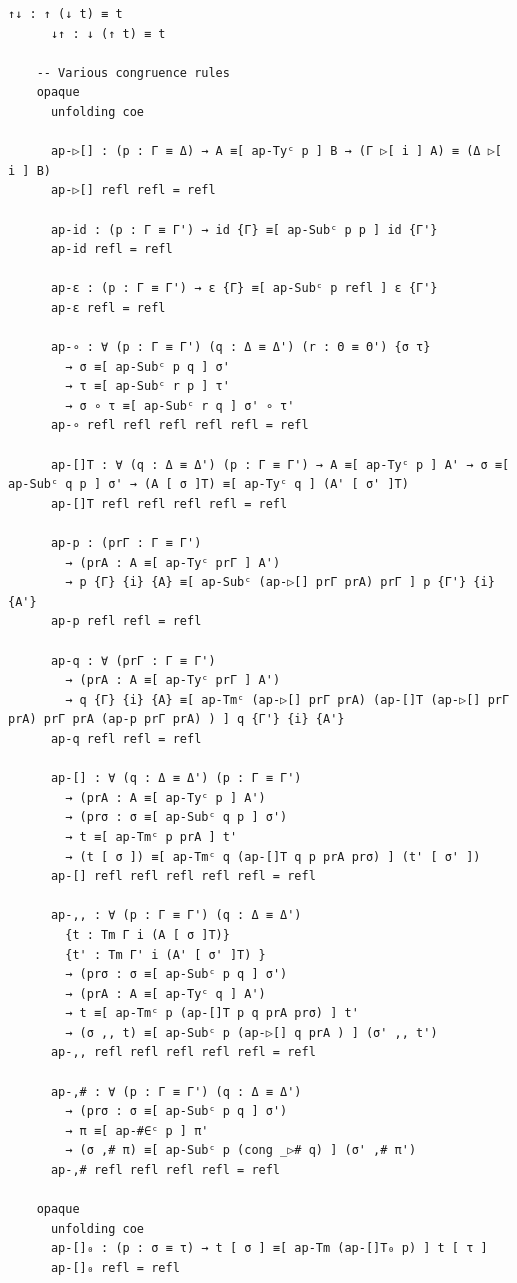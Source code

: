 {\begin{Verbatim}[breaklines=true,breakanywhere=true,fontsize=\scriptsize]
      ↑↓ : ↑ (↓ t) ≡ t
      ↓↑ : ↓ (↑ t) ≡ t

    -- Various congruence rules
    opaque
      unfolding coe

      ap-▷[] : (p : Γ ≡ Δ) → A ≡[ ap-Tyᶜ p ] B → (Γ ▷[ i ] A) ≡ (Δ ▷[ i ] B)
      ap-▷[] refl refl = refl

      ap-id : (p : Γ ≡ Γ') → id {Γ} ≡[ ap-Subᶜ p p ] id {Γ'}
      ap-id refl = refl

      ap-ε : (p : Γ ≡ Γ') → ε {Γ} ≡[ ap-Subᶜ p refl ] ε {Γ'}
      ap-ε refl = refl

      ap-∘ : ∀ (p : Γ ≡ Γ') (q : Δ ≡ Δ') (r : Θ ≡ Θ') {σ τ}
        → σ ≡[ ap-Subᶜ p q ] σ'
        → τ ≡[ ap-Subᶜ r p ] τ'
        → σ ∘ τ ≡[ ap-Subᶜ r q ] σ' ∘ τ'
      ap-∘ refl refl refl refl refl = refl

      ap-[]T : ∀ (q : Δ ≡ Δ') (p : Γ ≡ Γ') → A ≡[ ap-Tyᶜ p ] A' → σ ≡[ ap-Subᶜ q p ] σ' → (A [ σ ]T) ≡[ ap-Tyᶜ q ] (A' [ σ' ]T)
      ap-[]T refl refl refl refl = refl

      ap-p : (prΓ : Γ ≡ Γ')
        → (prA : A ≡[ ap-Tyᶜ prΓ ] A')
        → p {Γ} {i} {A} ≡[ ap-Subᶜ (ap-▷[] prΓ prA) prΓ ] p {Γ'} {i} {A'}
      ap-p refl refl = refl

      ap-q : ∀ (prΓ : Γ ≡ Γ')
        → (prA : A ≡[ ap-Tyᶜ prΓ ] A')
        → q {Γ} {i} {A} ≡[ ap-Tmᶜ (ap-▷[] prΓ prA) (ap-[]T (ap-▷[] prΓ prA) prΓ prA (ap-p prΓ prA) ) ] q {Γ'} {i} {A'}
      ap-q refl refl = refl

      ap-[] : ∀ (q : Δ ≡ Δ') (p : Γ ≡ Γ')
        → (prA : A ≡[ ap-Tyᶜ p ] A')
        → (prσ : σ ≡[ ap-Subᶜ q p ] σ')
        → t ≡[ ap-Tmᶜ p prA ] t'
        → (t [ σ ]) ≡[ ap-Tmᶜ q (ap-[]T q p prA prσ) ] (t' [ σ' ])
      ap-[] refl refl refl refl refl = refl

      ap-,, : ∀ (p : Γ ≡ Γ') (q : Δ ≡ Δ')
        {t : Tm Γ i (A [ σ ]T)}
        {t' : Tm Γ' i (A' [ σ' ]T) }
        → (prσ : σ ≡[ ap-Subᶜ p q ] σ')
        → (prA : A ≡[ ap-Tyᶜ q ] A')
        → t ≡[ ap-Tmᶜ p (ap-[]T p q prA prσ) ] t'
        → (σ ,, t) ≡[ ap-Subᶜ p (ap-▷[] q prA ) ] (σ' ,, t')
      ap-,, refl refl refl refl refl = refl

      ap-,# : ∀ (p : Γ ≡ Γ') (q : Δ ≡ Δ')
        → (prσ : σ ≡[ ap-Subᶜ p q ] σ')
        → π ≡[ ap-#∈ᶜ p ] π'
        → (σ ,# π) ≡[ ap-Subᶜ p (cong _▷# q) ] (σ' ,# π')
      ap-,# refl refl refl refl = refl

    opaque
      unfolding coe
      ap-[]₀ : (p : σ ≡ τ) → t [ σ ] ≡[ ap-Tm (ap-[]T₀ p) ] t [ τ ]
      ap-[]₀ refl = refl


\end{Verbatim}}
